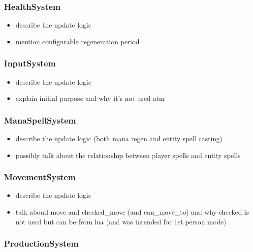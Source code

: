 \subsubsection{HealthSystem}

\begin{itemize}
    \item describe the update logic
    \item mention configurable regeneration period
\end{itemize}

\subsubsection{InputSystem}

\begin{itemize}
    \item describe the update logic
    \item explain initial purpose and why it's not used atm
\end{itemize}

\subsubsection{ManaSpellSystem}

\begin{itemize}
    \item describe the update logic (both mana regen and entity spell casting)
    \item possibly talk about the relationship between player spells and entity spells
\end{itemize}

\subsubsection{MovementSystem}

\begin{itemize}
    \item describe the update logic
    \item talk aboud move and checked\_move (and can\_move\_to) and why checked is not used
        but can be from lua (and was intended for 1st person mode)
\end{itemize}

\subsubsection{ProductionSystem}

